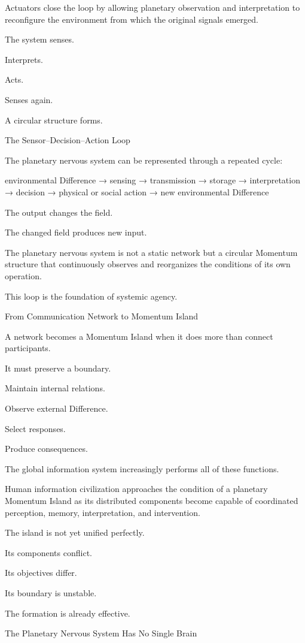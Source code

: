 Actuators close the loop by allowing planetary observation and interpretation to reconfigure the environment from which the original signals emerged.

The system senses.

Interprets.

Acts.

Senses again.

A circular structure forms.

The Sensor–Decision–Action Loop

The planetary nervous system can be represented through a repeated cycle:

environmental Difference
→ sensing
→ transmission
→ storage
→ interpretation
→ decision
→ physical or social action
→ new environmental Difference

The output changes the field.

The changed field produces new input.

The planetary nervous system is not a static network but a circular Momentum structure that continuously observes and reorganizes the conditions of its own operation.

This loop is the foundation of systemic agency.

From Communication Network to Momentum Island

A network becomes a Momentum Island when it does more than connect participants.

It must preserve a boundary.

Maintain internal relations.

Observe external Difference.

Select responses.

Produce consequences.

The global information system increasingly performs all of these functions.

Human information civilization approaches the condition of a planetary Momentum Island as its distributed components become capable of coordinated perception, memory, interpretation, and intervention.

The island is not yet unified perfectly.

Its components conflict.

Its objectives differ.

Its boundary is unstable.

The formation is already effective.

The Planetary Nervous System Has No Single Brain

